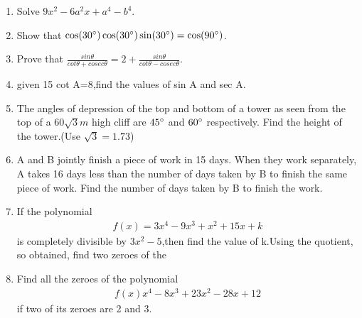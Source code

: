 \documentclass{article}
\begin{document}
\begin{enumerate}
\item Solve $9x^2-6a^2x+a^4-b^4$.

\item Show that $\cos(30\degree) \cos(30\degree) \sin(30\degree)=\cos(90\degree)$.

\item Prove that $\frac{sin\theta}{cot\theta+cosec\theta}=2+\frac{sin\theta}{cot\theta-cosec\theta}$.

\item given 15 cot A=8,find the values of sin A and sec A.

\item The angles of depression of the top and bottom of a tower as seen from the top of a $60\sqrt{3}m$ high cliff are $45\degree$ and $60\degree$ respectively. Find the height of the tower.(Use $\sqrt{3}=1.73$)
\item A and B jointly finish a piece of work in 15 days. When they work 
separately, A takes 16 days less than the number of days taken by B to 
finish the same piece of work. Find the number of days taken by B to 
finish the work.
\item If the polynomial \begin{align} 
f(x)=3x^4-9x^3+x^2+15x+k
\end{align} is completely divisible by $3x^2-5$,then find the value of k.Using the quotient, so obtained, find two zeroes of the 
\item Find all the zeroes of the polynomial \begin{align}
    f(x)x^4-8x^3+23x^2-28x+12
\end{align} if two of its zeroes are 2 and 3. 
\end{enumerate} 
\pagebreak
\end{document}
